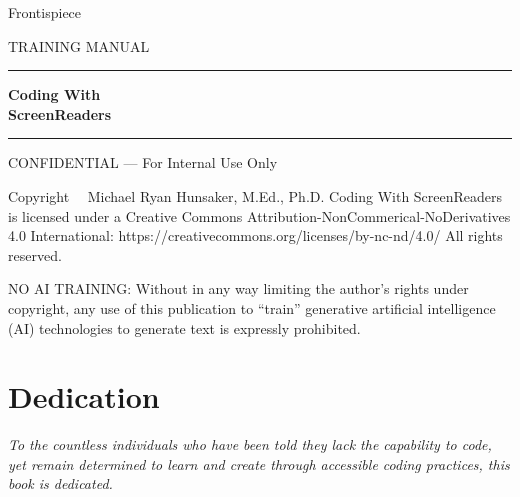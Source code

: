 \documentclass[
  justified,
  openright,
]{tufte-book}
\begin{document}
\frontmatter
\pagestyle{fancy}

\thispagestyle{empty}
\null
\clearpage

\thispagestyle{empty}
\begin{center}
  \vspace*{0.35\textheight}
  {\sffamily\large Frontispiece}
\end{center}
\clearpage

\begin{titlepage}
    \vspace*{1.6in}
    {\sffamily\fontsize{9}{11}\selectfont\MakeUppercase{Training Manual}}
    \vspace{0.3in}
    {\color{BrandAccent}\rule{4.5in}{2pt}}
    \vspace{0.25in}
    {\sffamily\bfseries\fontsize{32}{38}\selectfont Coding With \\ScreenReaders}
    \vspace{0.2in}
    {\color{BrandAccent}\rule{4.5in}{0.6pt}}
    \vspace{0.5in}
    \vfill
    {\sffamily\fontsize{7.5}{9}\selectfont\color{MidGray}%
      CONFIDENTIAL --- For Internal Use Only%
    }
  \clearpage
  \nopagecolor
\end{titlepage}

\thispagestyle{empty}
\vspace*{0.25\textheight}
{\small
\noindent Copyright \textcopyright\ \the\year\ Michael Ryan Hunsaker, M.Ed., Ph.D. Coding With ScreenReaders is licensed under a Creative Commons Attribution-NonCommerical-NoDerivatives 4.0 International: https://creativecommons.org/licenses/by-nc-nd/4.0/  All rights reserved.

\noindent NO AI TRAINING: Without in any way limiting the author's rights under copyright, any use of this publication to “train” generative artificial intelligence (AI) technologies to generate text is expressly prohibited.
}

\clearpage

{
\hypersetup{linkcolor=BrandBlue}
\tableofcontents
\clearpage
}

\chapter*{Dedication}
\thispagestyle{empty}
\begin{center}
  \vspace*{0.3\textheight}
  {\itshape To the countless individuals who have been told they lack the capability to code, yet remain determined to learn and create through accessible coding practices, this book is dedicated.}\\[1em]
\end{center}
\clearpage
\end{document}
